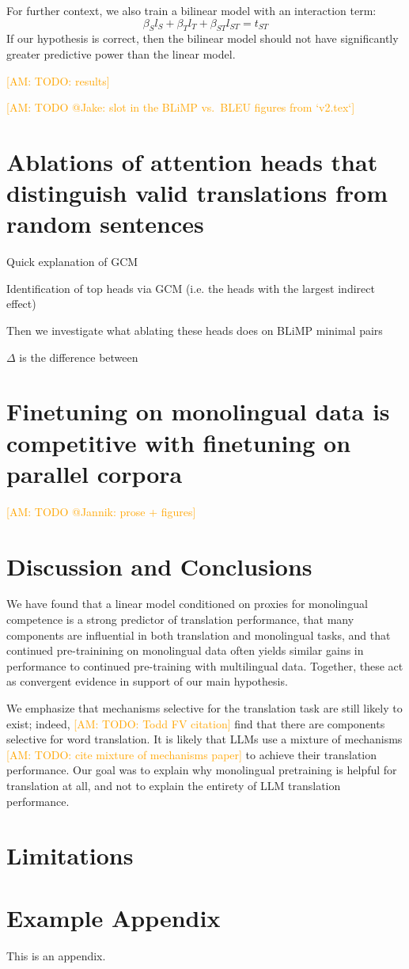 \documentclass[11pt]{article}
\newcommand{\am}[1]{\textcolor{orange}{[AM: #1]}}
\begin{document}
For further context, we also train a bilinear model with an interaction term:
\begin{equation}
    \beta_Sl_S + \beta_Tl_T + \beta_{ST}l_{ST} = t_{ST}
\end{equation}
If our hypothesis is correct, then the bilinear model should not have significantly greater predictive power than the linear model.

\am{TODO: results}

\am{TODO @Jake: slot in the BLiMP vs.\ BLEU figures from `v2.tex`}

\section{Ablations of attention heads that distinguish valid translations from random sentences}

Quick explanation of GCM

Identification of top heads via GCM (i.e. the heads with the largest indirect effect)

Then we investigate what ablating these heads does on BLiMP minimal pairs

$\Delta$ is the difference between 

\section{Finetuning on monolingual data is competitive with finetuning on parallel corpora}

\am{TODO @Jannik: prose + figures}

\section{Discussion and Conclusions}
We have found that a linear model conditioned on proxies for monolingual competence is a strong predictor of translation performance, that many components are influential in both translation and monolingual tasks, and that continued pre-trainining on monolingual data often yields similar gains in performance to continued pre-training with multilingual data. Together, these act as convergent evidence in support of our main hypothesis.

We emphasize that mechanisms selective for the translation task are still likely to exist; indeed, \am{TODO: Todd FV citation} find that there are components selective for word translation. It is likely that LLMs use a mixture of mechanisms \am{TODO: cite mixture of mechanisms paper} to achieve their translation performance. Our goal was to explain why monolingual pretraining is helpful for translation at all, and not to explain the entirety of LLM translation performance.

\section*{Limitations}



\appendix

\section{Example Appendix}
\label{sec:appendix}

This is an appendix.
\end{document}
